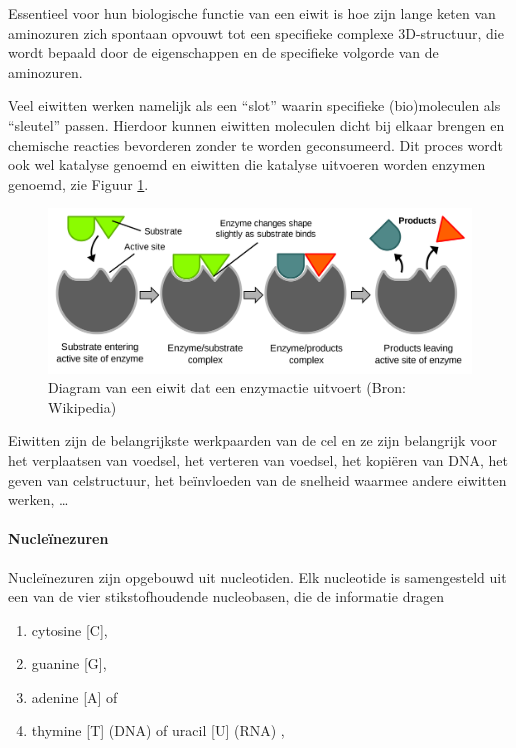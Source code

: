 \documentclass[
  11pt,
]{book}
\providecommand{\tightlist}{%
  \setlength{\itemsep}{0pt}\setlength{\parskip}{0pt}}
\begin{document}
Essentieel voor hun biologische functie van een eiwit is hoe zijn lange keten van aminozuren zich spontaan opvouwt tot een specifieke complexe 3D-structuur, die wordt bepaald door de eigenschappen en de specifieke volgorde van de aminozuren.

Veel eiwitten werken namelijk als een ``slot'' waarin specifieke (bio)moleculen als ``sleutel'' passen. Hierdoor kunnen eiwitten moleculen dicht bij elkaar brengen en chemische reacties bevorderen zonder te worden geconsumeerd. Dit proces wordt ook wel katalyse genoemd en eiwitten die katalyse uitvoeren worden enzymen genoemd, zie Figuur \ref{fig:enzyme}.

\begin{figure}

{\centering \includegraphics[width=0.5\linewidth]{./figs/EnzymePadlockKey} 

}

\caption{Diagram van een eiwit dat een enzymactie uitvoert (Bron: Wikipedia)}\label{fig:enzyme}
\end{figure}

Eiwitten zijn de belangrijkste werkpaarden van de cel en ze zijn belangrijk voor het verplaatsen van voedsel, het verteren van voedsel, het kopiëren van DNA, het geven van celstructuur, het beïnvloeden van de snelheid waarmee andere eiwitten werken, \ldots{}

\pagebreak

\hypertarget{sectionNucleicAcids}{%
\paragraph{Nucleïnezuren}\label{sectionNucleicAcids}}

Nucleïnezuren zijn opgebouwd uit nucleotiden. Elk nucleotide is samengesteld uit een van de vier stikstofhoudende nucleobasen, die de informatie dragen

\begin{enumerate}
\def\labelenumi{\arabic{enumi}.}
\tightlist
\item
  cytosine {[}C{]},
\item
  guanine {[}G{]},
\item
  adenine {[}A{]} of
\item
  thymine {[}T{]} (DNA) of uracil {[}U{]} (RNA) ,
\end{enumerate}
\end{document}
